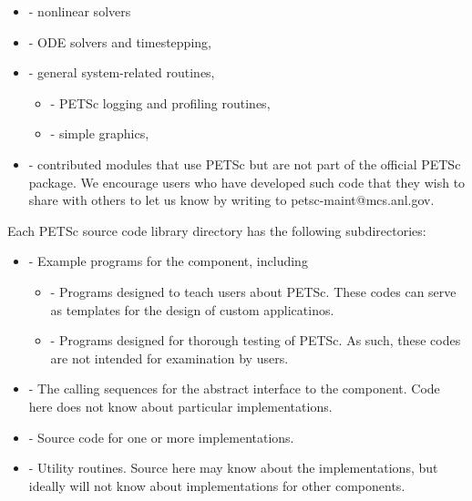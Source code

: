 \begin{itemize}
\begin{itemize}
 \item {} - nonlinear solvers
 \item {} - ODE solvers and timestepping,
 \item {} - general system-related routines,
 \begin{itemize}
   \item {} - PETSc logging and profiling routines,
   \item {} - simple graphics,
 \end{itemize}
 \item {} - contributed modules that use PETSc but are not
    part of the official PETSc package.  We encourage users who have
    developed such code that they wish to share with others to let us
    know by writing to petsc-maint@mcs.anl.gov.
 \end{itemize}
\end{itemize}

Each PETSc source code library directory has the following subdirectories:
\begin{itemize}
\item  {} - Example programs for the component, including
  \begin{itemize}
  \item {} - Programs designed to teach users about PETSc.  These
          codes can serve as templates for the design of custom applicatinos.
  \item {} - Programs designed for thorough testing of PETSc.  As such,
          these codes are not intended for examination by users.
  \end{itemize}
\item  {} - The calling sequences for the abstract interface  
        to the component.
        Code here does not know about particular implementations.
\item  {} - Source code for one or more implementations.
\item  {} - Utility routines.  Source here may know about the 
          implementations, but ideally will not know about implementations
          for other components.
\end{itemize}

%
%


